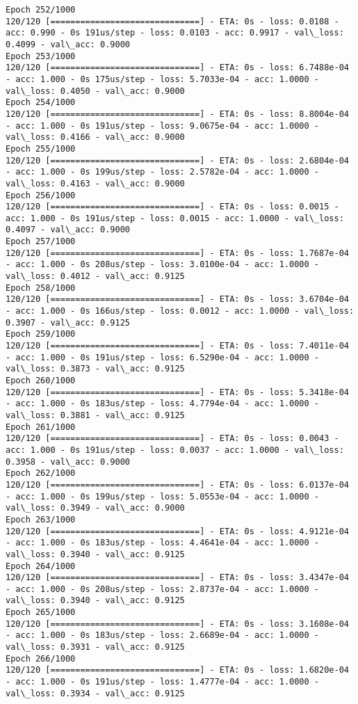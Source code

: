 \documentclass[11pt]{article}
\begin{document}
\begin{Verbatim}[commandchars=\\\{\}]
Epoch 252/1000
120/120 [==============================] - ETA: 0s - loss: 0.0108 - acc: 0.990 - 0s 191us/step - loss: 0.0103 - acc: 0.9917 - val\_loss: 0.4099 - val\_acc: 0.9000
Epoch 253/1000
120/120 [==============================] - ETA: 0s - loss: 6.7488e-04 - acc: 1.000 - 0s 175us/step - loss: 5.7033e-04 - acc: 1.0000 - val\_loss: 0.4050 - val\_acc: 0.9000
Epoch 254/1000
120/120 [==============================] - ETA: 0s - loss: 8.8004e-04 - acc: 1.000 - 0s 191us/step - loss: 9.0675e-04 - acc: 1.0000 - val\_loss: 0.4166 - val\_acc: 0.9000
Epoch 255/1000
120/120 [==============================] - ETA: 0s - loss: 2.6804e-04 - acc: 1.000 - 0s 199us/step - loss: 2.5782e-04 - acc: 1.0000 - val\_loss: 0.4163 - val\_acc: 0.9000
Epoch 256/1000
120/120 [==============================] - ETA: 0s - loss: 0.0015 - acc: 1.000 - 0s 191us/step - loss: 0.0015 - acc: 1.0000 - val\_loss: 0.4097 - val\_acc: 0.9000
Epoch 257/1000
120/120 [==============================] - ETA: 0s - loss: 1.7687e-04 - acc: 1.000 - 0s 208us/step - loss: 3.0100e-04 - acc: 1.0000 - val\_loss: 0.4012 - val\_acc: 0.9125
Epoch 258/1000
120/120 [==============================] - ETA: 0s - loss: 3.6704e-04 - acc: 1.000 - 0s 166us/step - loss: 0.0012 - acc: 1.0000 - val\_loss: 0.3907 - val\_acc: 0.9125
Epoch 259/1000
120/120 [==============================] - ETA: 0s - loss: 7.4011e-04 - acc: 1.000 - 0s 191us/step - loss: 6.5290e-04 - acc: 1.0000 - val\_loss: 0.3873 - val\_acc: 0.9125
Epoch 260/1000
120/120 [==============================] - ETA: 0s - loss: 5.3418e-04 - acc: 1.000 - 0s 183us/step - loss: 4.7794e-04 - acc: 1.0000 - val\_loss: 0.3881 - val\_acc: 0.9125
Epoch 261/1000
120/120 [==============================] - ETA: 0s - loss: 0.0043 - acc: 1.000 - 0s 191us/step - loss: 0.0037 - acc: 1.0000 - val\_loss: 0.3958 - val\_acc: 0.9000
Epoch 262/1000
120/120 [==============================] - ETA: 0s - loss: 6.0137e-04 - acc: 1.000 - 0s 199us/step - loss: 5.0553e-04 - acc: 1.0000 - val\_loss: 0.3949 - val\_acc: 0.9000
Epoch 263/1000
120/120 [==============================] - ETA: 0s - loss: 4.9121e-04 - acc: 1.000 - 0s 183us/step - loss: 4.4641e-04 - acc: 1.0000 - val\_loss: 0.3940 - val\_acc: 0.9125
Epoch 264/1000
120/120 [==============================] - ETA: 0s - loss: 3.4347e-04 - acc: 1.000 - 0s 208us/step - loss: 2.8737e-04 - acc: 1.0000 - val\_loss: 0.3940 - val\_acc: 0.9125
Epoch 265/1000
120/120 [==============================] - ETA: 0s - loss: 3.1608e-04 - acc: 1.000 - 0s 183us/step - loss: 2.6689e-04 - acc: 1.0000 - val\_loss: 0.3931 - val\_acc: 0.9125
Epoch 266/1000
120/120 [==============================] - ETA: 0s - loss: 1.6820e-04 - acc: 1.000 - 0s 191us/step - loss: 1.4777e-04 - acc: 1.0000 - val\_loss: 0.3934 - val\_acc: 0.9125

\end{Verbatim}
\end{document}
